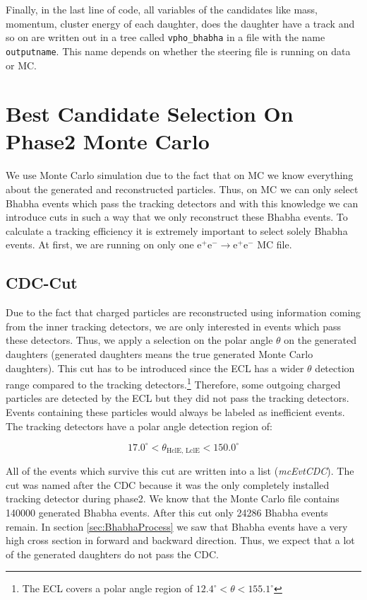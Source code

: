 \documentclass[a4paper,11pt,twosided,final,german,openbib,pdftex,listof=totoc,bibliography=totoc]{scrbook}
\begin{document}
Finally, in the last line of code, all variables of the candidates like mass, momentum, cluster energy of each daughter, does the daughter have a track and so on are written out in a tree called \texttt{vpho\_bhabha} in a file with the name \texttt{outputname}. This name depends on whether the steering file is running on data or MC.


\section{Best Candidate Selection On Phase2 Monte Carlo}
\label{sec:SelectingBhabhaMC}

We use Monte Carlo simulation due to the fact that on MC we know everything about the generated and reconstructed particles. Thus, on MC we can only select Bhabha events which pass the tracking detectors and with this knowledge we can introduce cuts in such a way that we only reconstruct these Bhabha events. To calculate a tracking efficiency it is extremely important to select solely Bhabha events. At first, we are running on only one $\textrm{e}^+ \textrm{e}^- \rightarrow \textrm{e}^+ \textrm{e}^-$ MC file.


\subsection{CDC-Cut}

Due to the fact that charged particles are reconstructed using information coming from the inner tracking detectors, we are only interested in events which pass these detectors. Thus, we apply a selection on the polar angle $\theta$ on the generated daughters (generated daughters means the true generated Monte Carlo daughters). This cut has to be introduced since the ECL has a wider $\theta$ detection range compared to the tracking detectors.\footnote{The ECL covers a polar angle region of $12.4^{\circ} < \theta < 155.1^{\circ}$} Therefore, some outgoing charged particles are detected by the ECL but they did not pass the tracking detectors. Events containing these particles would always be labeled as inefficient events.
The tracking detectors have a polar angle detection region of:

\begin{equation}
	17.0^\circ < \theta_{\textrm{HclE, LclE}} < 150.0^\circ
\end{equation}

All of the events which survive this cut are written into a list (\textit{mcEvtCDC}). The cut was named after the CDC because it was the only completely installed tracking detector during phase2. We know that the Monte Carlo file contains 140000 generated Bhabha events. After this cut only 24286 Bhabha events remain.
In section \ref{sec:BhabhaProcess} we saw that Bhabha events have a very high cross section in forward and backward  direction. Thus, we expect that a lot of the generated daughters do not pass the CDC. 
\newline
\end{document}
